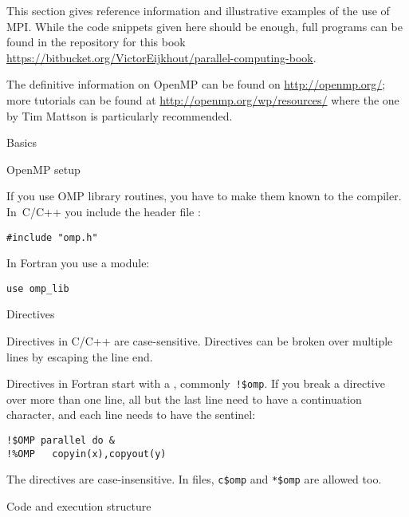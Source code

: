 
This section gives reference information and illustrative examples
of the use of MPI. While the code snippets given here should be enough,
full programs can be found in the repository for this book
\url{https://bitbucket.org/VictorEijkhout/parallel-computing-book}.

The definitive information on OpenMP can be found on
\url{http://openmp.org/}; more tutorials can be found at
\url{http://openmp.org/wp/resources/} where the one
by Tim Mattson is particularly recommended.

 {Basics}

 {OpenMP setup}

If you use OMP library routines, you have to make them known to
the compiler. In~C/C++ you include the header file :
\begin{verbatim}
#include "omp.h"
\end{verbatim}
In Fortran you use a module:
\begin{verbatim}
use omp_lib
\end{verbatim}

 {Directives}

Directives in C/C++ are case-sensitive. Directives can be broken over
multiple lines by escaping the line end.

Directives in Fortran start with a , commonly~\verb+!$omp+.
If you break a directive over more than one line, all but the last line
need to have a continuation character, and each line needs to have the sentinel:
\begin{verbatim}
!$OMP parallel do &
!%OMP   copyin(x),copyout(y)
\end{verbatim}
  The directives are case-insensitive. In
   files, \verb+c$omp+ and
  \verb+*$omp+ are allowed too.


 {Code and execution structure}

